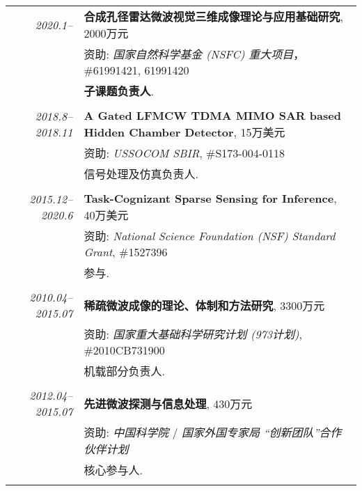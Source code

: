 \documentclass[paper=a4,fontsize=11pt]{scrartcl}
\begin{document}
\begin{longtable}{r|p{12cm}}
	\emph{2020.1--} & \textbf{合成孔径雷达微波视觉三维成像理论与应用基础研究}, 2000万元 \\
	& 资助: \emph{国家自然科学基金 (NSFC) 重大项目}， \#61991421, 61991420\\
	& \textbf{子课题负责人}.\\
	\multicolumn{2}{c}{} \\

	
	\emph{2018.8--2018.11} & \textbf{A Gated LFMCW TDMA MIMO SAR based Hidden Chamber Detector}, 15万美元 \\
	& 资助: \emph{USSOCOM SBIR}, \#S173-004-0118\\
	& 信号处理及仿真负责人.\\
	\multicolumn{2}{c}{} \\
	
	\emph{2015.12--2020.6} & \textbf{Task-Cognizant Sparse Sensing for Inference}, 40万美元 \\
	& 资助: \emph{National Science Foundation (NSF) Standard Grant}, \#1527396\\
	& 参与.\\
	\multicolumn{2}{c}{} \\
	
	
	
	\emph{2010.04--2015.07} & \textbf{稀疏微波成像的理论、体制和方法研究}, 3300万元 \\
	& 资助: \emph{国家重大基础科学研究计划 (973计划)}, \#2010CB731900\\
	& 机载部分负责人.\\
	\multicolumn{2}{c}{} \\
	
	\emph{2012.04--2015.07} & \textbf{先进微波探测与信息处理}, 430万元 \\
	& 资助: \emph{中国科学院} / \emph{国家外国专家局 ``创新团队''合作伙伴计划}\\
	& 核心参与人.\\
	\multicolumn{2}{c}{} 
	
\end{longtable}
\end{document}
